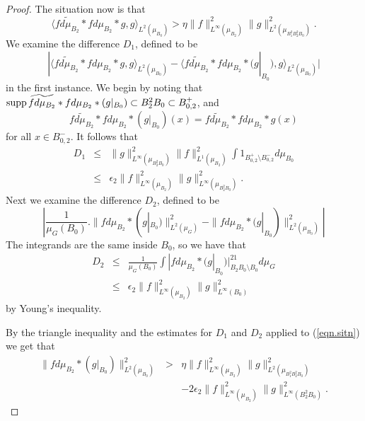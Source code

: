 \documentclass[12pt]{amsart}
\numberwithin{equation}{section}
\theoremstyle{plain}
\theoremstyle{definition}
\renewcommand{\leq}{\leqslant}
\providecommand{\supp}{\mathop{\rm supp}\nolimits}
\begin{document}
\begin{proof}
The situation now is that
\begin{equation}\label{eqn.sitn}
\langle \widetilde{fd\mu_{B_2}} \ast fd\mu_{B_2} \ast g, g\rangle_{L^2(\mu_{B_0})}> \eta  \|f\|_{L^\infty(\mu_{B_2})}^2 \|g\|_{L^2(\mu_{B_1^2B_2^2B_0})}^2.
\end{equation}
We examine the difference $D_1$, defined to be
\begin{equation*}
|\langle \widetilde{fd\mu_{B_2}} \ast fd\mu_{B_2} \ast g, g\rangle_{L^2(\mu_{B_0})}-\langle \widetilde{fd\mu_{B_2}} \ast fd\mu_{B_2} \ast (g|_{B_0}), g\rangle_{L^2(\mu_{B_0})}|
\end{equation*}
in the first instance.  We begin by noting that $\supp \widetilde{fd\mu_{B_2}} \ast fd\mu_{B_2} \ast (g|_{B_0}) \subset B_2^2B_0 \subset B_{0,2}^+$, and
\begin{equation*}
 \widetilde{fd\mu_{B_2}} \ast fd\mu_{B_2} \ast (g|_{B_0})(x) =  \widetilde{fd\mu_{B_2}} \ast fd\mu_{B_2} \ast g(x)
\end{equation*}
for all $x \in B_{0,2}^-$.  It follows that
\begin{eqnarray*}
D_1& \leq &\|g\|_{L^\infty(\mu_{B_2^2B_0})}^2\|f\|_{L^1(\mu_{B_2})}^2\int{1_{B_{0,2}^+\setminus B_{0,2}^-}d\mu_{B_0}}\\ & \leq &  \epsilon_2\|f\|_{L^\infty(\mu_{B_2})}^2\|g\|_{L^\infty(\mu_{B_2^2B_0})}^2.
\end{eqnarray*}
Next we examine the difference $D_2$, defined to be
\begin{equation*}
|\frac{1}{\mu_G(B_0)}.\|fd\mu_{B_2} \ast (g|_{B_0})\|_{L^2(\mu_G)}^2 - \|fd\mu_{B_2} \ast (g|_{B_0})\|_{L^2(\mu_{B_0})}^2|
\end{equation*}
The integrands are the same inside $B_0$, so we have that
\begin{eqnarray*}
D_2 & \leq & \frac{1}{\mu_G(B_0)}\int{|fd\mu_{B_2} \ast (g|_{B_0})|^21_{B_2B_0\setminus B_0}d\mu_G}\\ & \leq & \epsilon_2\|f\|_{L^\infty(\mu_{B_2})}^2\|g\|_{L^\infty(B_0)}^2 
\end{eqnarray*}
by Young's inequality.

By the triangle inequality and the estimates for $D_1$ and $D_2$ applied to (\ref{eqn.sitn}) we get that
\begin{eqnarray}
\nonumber  \|fd\mu_{B_2} \ast (g|_{B_0})\|_{L^2(\mu_{B_0})}^2& >& \eta  \|f\|_{L^\infty(\mu_{B_2})}^2\|g\|_{L^2(\mu_{B_1^2B_2^2B_0})}^2\\ \label{eqn.fg}& & - 2\epsilon_2\|f\|_{L^\infty(\mu_{B_2})}^2\|g\|_{L^\infty(B_2^2B_0)}^2.
\end{eqnarray}


\end{proof}
\end{document}
